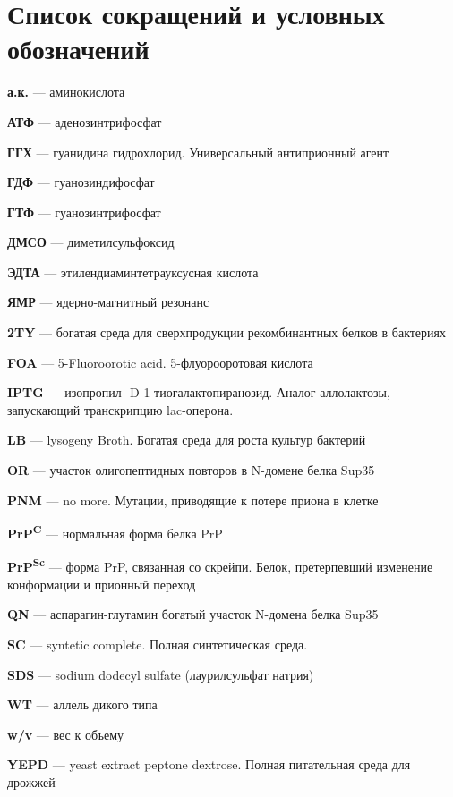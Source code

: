 \chapter{Список сокращений и условных обозначений}             %

\vskip -24pt

\textbf{а.к.} --- аминокислота

\textbf{АТФ} --- аденозинтрифосфат

\textbf{ГГХ} --- гуанидина гидрохлорид. Универсальный антиприонный агент

\textbf{ГДФ} --- гуанозиндифосфат

\textbf{ГТФ} --- гуанозинтрифосфат

\textbf{ДМСО} --- диметилсульфоксид

\textbf{ЭДТА} --- этилендиаминтетрауксусная кислота

\textbf{ЯМР} --- ядерно-магнитный резонанс

\textbf{2TY} --- богатая среда для сверхпродукции рекомбинантных белков в бактериях

\textbf{FOA} --- 5-Fluoroorotic acid. 5-флуорооротовая кислота

\textbf{IPTG} --- изопропил-\textbeta-D-1-тиогалактопиранозид. Аналог аллолактозы, запускающий транскрипцию lac-оперона.

\textbf{LB} --- lysogeny Broth. Богатая среда для роста культур бактерий

\textbf{OR} --- участок олигопептидных повторов в N-домене белка Sup35

\textbf{PNM} --- \PSI no more. Мутации, приводящие к потере приона \PSI в клетке

\textbf{PrP\textsuperscript{C}} --- нормальная форма белка PrP

\textbf{PrP\textsuperscript{Sc}} --- форма PrP, связанная со скрейпи. Белок, претерпевший изменение конформации и прионный переход

\textbf{QN} --- аспарагин-глутамин богатый участок N-домена белка Sup35

\textbf{SC} --- syntetic complete. Полная синтетическая среда.

\textbf{SDS}  --- sodium dodecyl sulfate (лаурилсульфат натрия)

\textbf{WT} --- аллель дикого типа

\textbf{w/v} --- вес к объему

\textbf{YEPD} --- yeast extract peptone dextrose. Полная питательная среда для дрожжей

